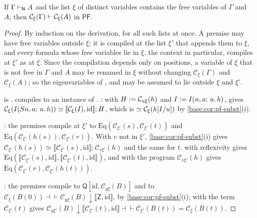 \begin{proposition}
\label{base:prop:pf-compile}
If $\Gamma\vdash_{\mathsf{N}}A$ and the list $\xi$ of distinct variables
contains the free variables of $\Gamma$ and $A$, then
$\mathcal C_\xi(\Gamma)\vdash\mathcal C_\xi(A)$ in $\mathsf{PF}$.
\end{proposition}

\begin{proof}
By induction on the derivation, for all such lists at once.  A premise may
have free variables outside $\xi$; it is compiled at the list $\xi'$ that
appends them to $\xi$, and every formula whose free variables lie in $\xi$,
the context in particular, compiles at $\xi'$ as at $\xi$.  Since the
compilation depends only on positions, a variable of $\xi$ that is not free
in $\Gamma$ and $A$ may be renamed in $\xi$ without changing
$\mathcal C_\xi(\Gamma)$ and $\mathcal C_\xi(A)$; so the eigenvariables of
,  and  may be assumed to lie
outside $\xi$ and $\xi'$.

 is .   compiles to an instance of
.  : with $H\mathrel{:=}\mathcal C_{u\xi}(h)$ and
$I\mathrel{:=}I(n,a;\,u.\,h)$,  gives
$\mathcal C_\xi(I(S n,a;\,u.\,h))\simeq
[\![\mathcal C_\xi(I),\mathrm{id}]\!];H$, which is
$\simeq\mathcal C_\xi(h[I/u])$ by \cref{base:cor:pf-subst}(i).

: the premises compile at $\xi'$ to
$\mathrm{Eq}(\mathcal C_{\xi'}(s),\mathcal C_{\xi'}(t))$ and
$\mathrm{Eq}(\mathcal C_{\xi'}(h(s)),\mathcal C_{\xi'}(r))$.  With $v$ not in
$\xi'$, \cref{base:cor:pf-subst}(i) gives
$\mathcal C_{\xi'}(h(s))\simeq\llbracket\mathcal C_{\xi'}(s),\mathrm{id}\rrbracket;
\mathcal C_{v\xi'}(h)$ and the same for $t$.   with
reflexivity gives $\mathrm{Eq}(\llbracket\mathcal C_{\xi'}(s),\mathrm{id}\rrbracket,
\llbracket\mathcal C_{\xi'}(t),\mathrm{id}\rrbracket)$, and 
with the program $\mathcal C_{v\xi'}(h)$ gives
$\mathrm{Eq}(\mathcal C_{\xi'}(r),\mathcal C_{\xi'}(h(t)))$.

: the premises compile to
$\mathsf Q[\mathrm{id},\mathcal C_{y\xi}(B)]$ and to
$\mathcal C_\xi(B(0))\dashv\vdash
\mathcal C_{y\xi}(B){\downarrow}\llbracket\mathsf Z,\mathrm{id}\rrbracket$, by
\cref{base:cor:pf-subst}(i);  with the term
$\mathcal C_{\xi'}(t)$ gives
$\mathcal C_{y\xi'}(B){\downarrow}\llbracket\mathcal C_{\xi'}(t),\mathrm{id}\rrbracket
\dashv\vdash\mathcal C_{\xi'}(B(t))=\mathcal C_\xi(B(t))$.


\end{proof}
